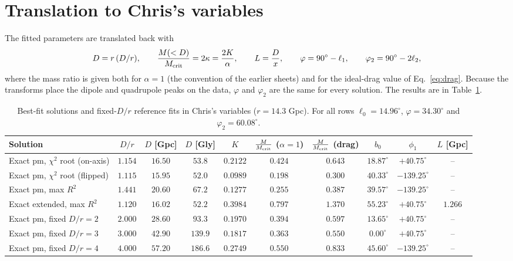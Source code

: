 \documentclass[10pt]{article}
\begin{document}
\section{Translation to Chris's variables}
The fitted parameters are translated back with
\begin{equation}
D=r\,(D/r),\qquad \frac{M(<D)}{M_{\rm crit}}=2\kappa=\frac{2K}{\alpha},\qquad L=\frac{D}{x},\qquad \varphi=90^\circ-\ell_1,\qquad \varphi_2=90^\circ-2\ell_2,
\label{eq:chris}
\end{equation}
where the mass ratio is given both for $\alpha=1$ (the convention of the earlier sheets) and for the ideal-drag value of Eq.~\eqref{eq:drag}. Because the transforms place the dipole and quadrupole peaks on the data, $\varphi$ and $\varphi_2$ are the same for every solution. The results are in Table~\ref{tab:chris}.

\begin{table}[!htb]\centering\small
\caption{Best-fit solutions and fixed-$D/r$ reference fits in Chris's variables ($r=14.3$ Gpc). For all rows $\ell_0=14.96^\circ$, $\varphi=34.30^\circ$ and $\varphi_2=60.08^\circ$.}\label{tab:chris}
\setlength{\tabcolsep}{3.3pt}
\begin{tabular}{lccccccccc}\toprule
Solution & $D/r$ & $D$ [Gpc] & $D$ [Gly] & $K$ & $\frac{M}{M_{\rm crit}}$ ($\alpha{=}1$) & $\frac{M}{M_{\rm crit}}$ (drag) & $b_0$ & $\phi_1$ & $L$ [Gpc]\\\midrule

Exact pm, $\chi^2$ root (on-axis) & $1.154$ & $16.50$ & $53.8$ & $0.2122$ & $0.424$ & $0.643$ & $18.87^\circ$ & $+40.75^\circ$ & --\\
Exact pm, $\chi^2$ root (flipped) & $1.115$ & $15.95$ & $52.0$ & $0.0989$ & $0.198$ & $0.300$ & $40.33^\circ$ & $-139.25^\circ$ & --\\
Exact pm, max $R^2$ & $1.441$ & $20.60$ & $67.2$ & $0.1277$ & $0.255$ & $0.387$ & $39.57^\circ$ & $-139.25^\circ$ & --\\
Exact extended, max $R^2$ & $1.120$ & $16.02$ & $52.2$ & $0.3984$ & $0.797$ & $1.370$ & $55.23^\circ$ & $+40.75^\circ$ & $1.266$\\
Exact pm, fixed $D/r=2$ & $2.000$ & $28.60$ & $93.3$ & $0.1970$ & $0.394$ & $0.597$ & $13.65^\circ$ & $+40.75^\circ$ & --\\
Exact pm, fixed $D/r=3$ & $3.000$ & $42.90$ & $139.9$ & $0.1817$ & $0.363$ & $0.550$ & $0.00^\circ$ & $+40.75^\circ$ & --\\
Exact pm, fixed $D/r=4$ & $4.000$ & $57.20$ & $186.6$ & $0.2749$ & $0.550$ & $0.833$ & $45.60^\circ$ & $-139.25^\circ$ & --\\
\bottomrule
\end{tabular}
\end{table}
\end{document}
